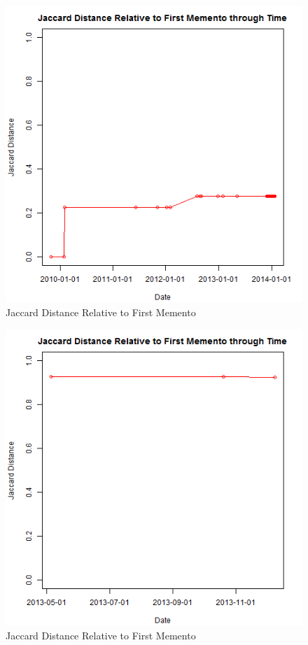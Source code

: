 \documentclass[12pt]{Report}
\begin{document}
\begin{figure}[ht]    
    \begin{center}
        \includegraphics[scale=0.60]{link6.png}
        \caption{Jaccard Distance Relative to First Memento }
        \label{Jaccard Distance Relative to First Memento}
    \end{center}
\end{figure}
\newpage

\begin{figure}[ht]    
    \begin{center}
        \includegraphics[scale=0.60]{link7.png}
        \caption{Jaccard Distance Relative to First Memento }
        \label{Jaccard Distance Relative to First Memento}
    \end{center}
\end{figure}
\newpage
\end{document}
